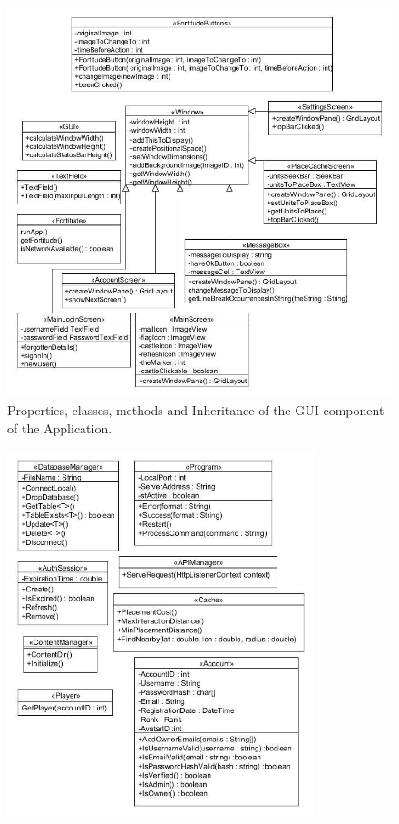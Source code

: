 \begin{figure}[h!]
    \centering
    \includegraphics[width=\textwidth]{imdfig4}
    \caption{Properties, classes, methods and Inheritance of the GUI component of the Application.}
\end{figure}


\begin{figure}[h!]
    \centering
    \includegraphics[width=0.8\textwidth]{imdfig5}
\end{figure}

